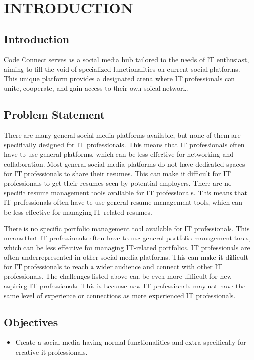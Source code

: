 \chapter{INTRODUCTION}



\section{Introduction}

Code Connect serves as a social media hub tailored to the needs of IT enthusiast, aiming to fill the void of specialized functionalities on current social platforms. This unique platform provides a designated arena where IT professionals can unite, cooperate, and gain access to their own soical network.
\section{Problem Statement}

There are many general social media platforms available, but none of them are specifically designed for IT professionals. This means that IT professionals often have to use general platforms, which can be less effective for networking and collaboration.
Most general social media platforms do not have dedicated spaces for IT professionals to share their resumes. This can make it difficult for IT professionals to get their resumes seen by potential employers.
There are no specific resume management tools available for IT professionals. This means that IT professionals often have to use general resume management tools, which can be less effective for managing IT-related resumes.

There is no specific portfolio management tool available for IT professionals. This means that IT professionals often have to use general portfolio management tools, which can be less effective for managing IT-related portfolios.
IT professionals are often underrepresented in other social media platforms. This can make it difficult for IT professionals to reach a wider audience and connect with other IT professionals.
The challenges listed above can be even more difficult for new aspiring IT professionals. This is because new IT professionals may not have the same level of experience or connections as more experienced IT professionals.
\section{Objectives}
\begin{itemize}
    \item Create a social media having normal functionalities and extra specifically  for creative it professionals.
\end{itemize}
